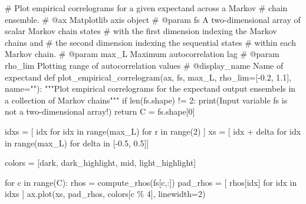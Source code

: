 \documentclass[
  letterpaper,
  DIV=11,
  numbers=noendperiod]{scrartcl}
\newenvironment{Shaded}{\begin{snugshade}}{\end{snugshade}}
\newcommand{\BuiltInTok}[1]{\textcolor[rgb]{0.00,0.23,0.31}{#1}}
\newcommand{\CommentTok}[1]{\textcolor[rgb]{0.37,0.37,0.37}{#1}}
\newcommand{\ControlFlowTok}[1]{\textcolor[rgb]{0.00,0.23,0.31}{#1}}
\newcommand{\DecValTok}[1]{\textcolor[rgb]{0.68,0.00,0.00}{#1}}
\newcommand{\FloatTok}[1]{\textcolor[rgb]{0.68,0.00,0.00}{#1}}
\newcommand{\KeywordTok}[1]{\textcolor[rgb]{0.00,0.23,0.31}{#1}}
\newcommand{\NormalTok}[1]{\textcolor[rgb]{0.00,0.23,0.31}{#1}}
\newcommand{\OperatorTok}[1]{\textcolor[rgb]{0.37,0.37,0.37}{#1}}
\newcommand{\StringTok}[1]{\textcolor[rgb]{0.13,0.47,0.30}{#1}}
\begin{document}
\begin{Shaded}
\begin{Highlighting}[]
\CommentTok{\# Plot empirical correlograms for a given expectand across a Markov }
\CommentTok{\# chain ensemble.}
\CommentTok{\# @ax Matplotlib axis object}
\CommentTok{\# @param fs A two{-}dimensional array of scalar Markov chain states }
\CommentTok{\#           with the first dimension indexing the Markov chains and }
\CommentTok{\#           the second dimension indexing the sequential states }
\CommentTok{\#           within each Markov chain.}
\CommentTok{\# @param max\_L Maximum autocorrelation lag}
\CommentTok{\# @param rho\_lim Plotting range of autocorrelation values}
\CommentTok{\# @display\_name Name of expectand}
\KeywordTok{def}\NormalTok{ plot\_empirical\_correlogram(ax,}
\NormalTok{                               fs,}
\NormalTok{                               max\_L,}
\NormalTok{                               rho\_lim}\OperatorTok{=}\NormalTok{[}\OperatorTok{{-}}\FloatTok{0.2}\NormalTok{, }\FloatTok{1.1}\NormalTok{],}
\NormalTok{                               name}\OperatorTok{=}\StringTok{""}\NormalTok{):}
  \CommentTok{"""Plot empirical correlograms for the expectand output ensembels in a}
\CommentTok{     collection of Markov chains"""}
  \ControlFlowTok{if} \BuiltInTok{len}\NormalTok{(fs.shape) }\OperatorTok{!=} \DecValTok{2}\NormalTok{:}
    \BuiltInTok{print}\NormalTok{(}\StringTok{\textquotesingle{}Input variable \textasciigrave{}fs\textasciigrave{} is not a two{-}dimensional array!\textquotesingle{}}\NormalTok{)}
    \ControlFlowTok{return}
\NormalTok{  C }\OperatorTok{=}\NormalTok{ fs.shape[}\DecValTok{0}\NormalTok{]}
  
\NormalTok{  idxs }\OperatorTok{=}\NormalTok{ [ idx }\ControlFlowTok{for}\NormalTok{ idx }\KeywordTok{in} \BuiltInTok{range}\NormalTok{(max\_L) }\ControlFlowTok{for}\NormalTok{ r }\KeywordTok{in} \BuiltInTok{range}\NormalTok{(}\DecValTok{2}\NormalTok{) ]}
\NormalTok{  xs }\OperatorTok{=}\NormalTok{ [ idx }\OperatorTok{+}\NormalTok{ delta }\ControlFlowTok{for}\NormalTok{ idx }\KeywordTok{in} \BuiltInTok{range}\NormalTok{(max\_L) }\ControlFlowTok{for}\NormalTok{ delta }\KeywordTok{in}\NormalTok{ [}\OperatorTok{{-}}\FloatTok{0.5}\NormalTok{, }\FloatTok{0.5}\NormalTok{]]}
  
\NormalTok{  colors }\OperatorTok{=}\NormalTok{ [dark, dark\_highlight, mid, light\_highlight]}
  
  \ControlFlowTok{for}\NormalTok{ c }\KeywordTok{in} \BuiltInTok{range}\NormalTok{(C):}
\NormalTok{    rhos }\OperatorTok{=}\NormalTok{ compute\_rhos(fs[c,:])}
\NormalTok{    pad\_rhos }\OperatorTok{=}\NormalTok{ [ rhos[idx] }\ControlFlowTok{for}\NormalTok{ idx }\KeywordTok{in}\NormalTok{ idxs ]}
\NormalTok{    ax.plot(xs, pad\_rhos, colors[c }\OperatorTok{\%} \DecValTok{4}\NormalTok{], linewidth}\OperatorTok{=}\DecValTok{2}\NormalTok{)}
  

\end{Highlighting}
\end{Shaded}
\end{document}
